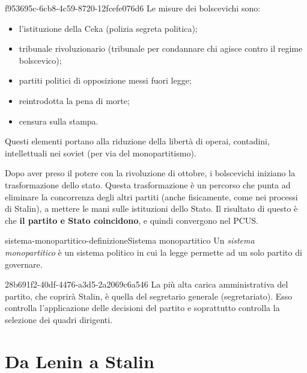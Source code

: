 \documentclass[preview]{standalone}
\begin{document}
\begin{snippet}{f953695c-6cb8-4c59-8720-12fcefe076d6}
    Le misure dei bolscevichi sono:
    \begin{itemize}
        \item l'istituzione della Ceka (polizia segreta politica);
        \item tribunale rivoluzionario (tribunale per condannare chi agisce contro il regime bolscevico);
        \item partiti politici di opposizione messi fuori legge;
        \item reintrodotta la pena di morte;
        \item censura sulla stampa.
    \end{itemize}
    Questi elementi portano alla riduzione della libertà di operai, contadini, intellettuali
    nei soviet (per via del monopartitismo).
    
    Dopo aver preso il potere con la rivoluzione di ottobre, i bolscevichi iniziano la trasformazione
    dello stato. Questa trasformazione è un percorso che punta ad eliminare la concorrenza
    degli altri partiti (anche fisicamente, come nei processi di Stalin),
    a mettere le mani sulle istituzioni dello Stato.
    Il risultato di questo è che \textbf{il partito e Stato coincidono},
    e quindi convergono nel PCUS.
\end{snippet}

\begin{snippetdefinition}{sistema-monopartitico-definizione}{Sistema monopartitico}
    Un \textit{sistema monopartitico} è un sistema politico in cui la legge
    permette ad un solo partito di governare.
\end{snippetdefinition}

\begin{snippet}{28b691f2-40df-4476-a3d5-2a2069c6a546}
    La più alta carica amministrativa del partito, che coprirà Stalin,
    è quella del segretario generale (segretariato).
    Esso controlla l'applicazione delle decisioni del partito e soprattutto controlla
    la selezione dei quadri dirigenti.
\end{snippet}

\section{Da Lenin a Stalin}
\end{document}
